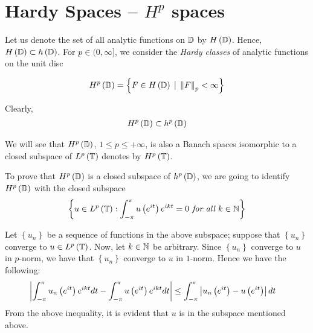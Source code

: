 
\section{Hardy Spaces -- \texorpdfstring{$H^p$}{} spaces}

Let us denote the set of all analytic functions on $\mathbb D$ by $H \left( \mathbb D \right)$. Hence, $H \left( \mathbb D \right) \subset h \left( \mathbb D \right)$. For $p\in (0,\infty]$, we consider the \textit{Hardy classes} of analytic functions on the unit disc

\begin{equation*}
    H^{p} \left( \mathbb D \right) = \left\{ F \in H \left( \mathbb D \right) \, \mid \, \left\lVert F \right\rVert _{p} < \infty \right\}
\end{equation*}

Clearly, 
\begin{align*}
    H^{p} \left( \mathbb D \right) \subset h ^{p} \left( \mathbb D \right)
\end{align*}

We will see that $H ^{p} \left( \mathbb D \right)$, $1\le p \le +\infty$, is also a Banach spaces isomorphic to a closed subspace of $L^{p} \left( \mathbb T \right)$ denotes by $H^{p} \left( \mathbb T \right)$.

To prove that $H^{p} \left( \mathbb D \right)$ is a closed subspace of $h^{p} \left( \mathbb D \right)$, we are going to identify $H^{p} \left( \mathbb D \right)$ with the closed subspace
\begin{align*}
    \left\{ u\in L^{p} \left( \mathbb T \right) : \int_{-\pi}^{\pi} u\left( e^{it} \right) e^{ikt} = 0 \textit{ for all } k \in \mathbb N \right\}
\end{align*}

Let $\left\{ u_{n} \right\}$ be a sequence of functions in the above subspace; suppose that $\left\{ u_{n} \right\}$ converge to $u\in L^{p} \left( \mathbb T \right)$. Now, let $k\in \mathbb N$ be arbitrary. Since $\left\{ u_{n} \right\}$ converge to $u$ in $p$-norm, we have that $\left\{ u_{n} \right\}$ converge to $u$ in $1$-norm. Hence we have the following:
\begin{align*}
    \left\lvert \int_{-\pi}^{\pi} u_{n} \left( e^{it} \right) e^{ikt} dt - \int_{-\pi}^{\pi} u \left( e^{it} \right) e^{ikt} dt  \right\rvert &\le \int_{-\pi}^{\pi} \left\lvert u_{n} \left( e^{it} \right) - u\left( e^{it} \right) \right\rvert dt
\end{align*}
From the above inequality, it is evident that $u$ is in the subspace mentioned above.

